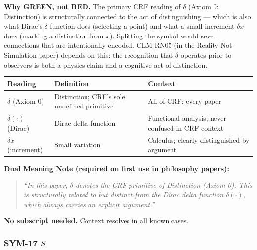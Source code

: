 \documentclass[12pt, a4paper]{article}
\begin{document}
\begin{greenbox}[title={SYM-16 \textmd{---} $\delta$ \textmd{(three readings — intentional)}}]
\textbf{Why GREEN, not RED.} The primary CRF reading of $\delta$
(Axiom 0: Distinction) is structurally connected to the act of
distinguishing — which is also what Dirac's $\delta$-function does
(selecting a point) and what a small increment $\delta x$ does
(marking a distinction from $x$). Splitting the symbol would
sever connections that are intentionally encoded. CLM-RN05 (in the
Reality-Not-Simulation paper) depends on this: the recognition that
$\delta$ operates prior to observers is both a physics claim and
a cognitive act of distinction.

\medskip
\renewcommand{\arraystretch}{1.35}
\begin{tabular}{p{2.8cm} p{4.5cm} p{4.5cm}}
\toprule
\textbf{Reading} & \textbf{Definition} & \textbf{Context}\\
\midrule
$\delta$ (Axiom 0) &
  Distinction; CRF's sole undefined primitive &
  All of CRF; every paper\\
$\delta(\cdot)$ (Dirac) &
  Dirac delta function &
  Functional analysis; never confused in CRF context\\
$\delta x$ (increment) &
  Small variation &
  Calculus; clearly distinguished by argument\\
\bottomrule
\end{tabular}

\medskip
\textbf{Dual Meaning Note (required on first use in philosophy
papers):}
\begin{quote}
\textit{``In this paper, $\delta$ denotes the CRF primitive of
Distinction (Axiom 0). This is structurally related to but distinct
from the Dirac delta function $\delta(\cdot)$, which always carries
an explicit argument.''}
\end{quote}

\textbf{No subscript needed.} Context resolves in all known cases.
\end{greenbox}

\subsubsection*{SYM-17 \quad $S$}
\end{document}
